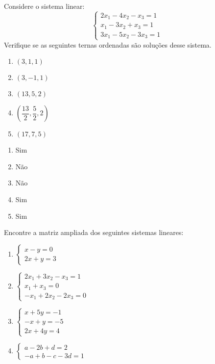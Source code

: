 \documentclass[12pt]{exam}
\begin{document}
\begin{exercicio}
  Considere o sistema linear:
  \[
    \begin{cases}
      2x_1 - 4x_2 - x_3 = 1\\
      x_1 - 3x_2 + x_3 = 1\\
      3x_1 - 5x_2 - 3x_3 = 1
    \end{cases}
  \]
  Verifique se as seguintes ternas ordenadas são soluções desse sistema.
  \begin{enumerate}[label={\alph*})]
    \item $(3,1,1)$
    \item $(3,-1,1)$
    \item $(13, 5, 2)$
    \item $\left(\dfrac{13}{2}, \dfrac{5}{2}, 2\right)$
    \item $(17,7,5)$
  \end{enumerate}
  \begin{solucao}
    \begin{enumerate}[label={\alph*})]
      \item Sim
      \item Não
      \item Não
      \item Sim
      \item Sim
    \end{enumerate}
  \end{solucao}
\end{exercicio}

\begin{exercicio}
  Encontre a matriz ampliada dos seguintes sistemas lineares:
  \begin{enumerate}[label={\alph*})]
    \item $\begin{cases}x - y = 0\\2x + y = 3\end{cases}$
    \item $\begin{cases}2x_1 + 3x_2 - x_3 = 1\\x_1 + x_3 = 0\\-x_1 + 2x_2 - 2x_3 = 0\end{cases}$
    \item $\begin{cases}x + 5y = -1\\-x + y = -5\\2x + 4y = 4\end{cases}$
    \item $\begin{cases}a - 2b + d = 2\\-a + b - c - 3d = 1\end{cases}$
  \end{enumerate}
\end{exercicio}
\end{document}
